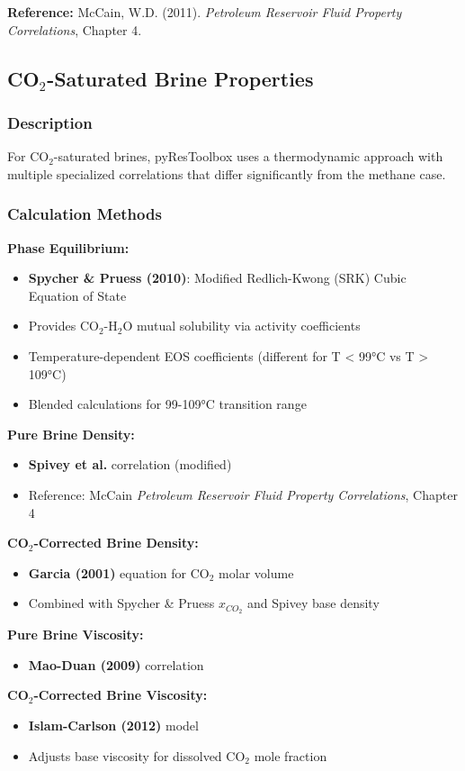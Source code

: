 \documentclass[11pt,a4paper]{article}
\begin{document}
\textbf{Reference:} McCain, W.D. (2011). \textit{Petroleum Reservoir Fluid Property Correlations}, Chapter 4.

\subsection{CO$_2$-Saturated Brine Properties}

\subsubsection{Description}
For CO$_2$-saturated brines, pyResToolbox uses a thermodynamic approach with multiple specialized correlations that differ significantly from the methane case.

\subsubsection{Calculation Methods}

\begin{tcolorbox}[colback=formulabox,colframe=black!75]
\textbf{Phase Equilibrium:}
\begin{itemize}
\item \textbf{Spycher \& Pruess (2010)}: Modified Redlich-Kwong (SRK) Cubic Equation of State
\item Provides CO$_2$-H$_2$O mutual solubility via activity coefficients
\item Temperature-dependent EOS coefficients (different for T < 99°C vs T > 109°C)
\item Blended calculations for 99-109°C transition range
\end{itemize}

\textbf{Pure Brine Density:}
\begin{itemize}
\item \textbf{Spivey et al.} correlation (modified)
\item Reference: McCain \textit{Petroleum Reservoir Fluid Property Correlations}, Chapter 4
\end{itemize}

\textbf{CO$_2$-Corrected Brine Density:}
\begin{itemize}
\item \textbf{Garcia (2001)} equation for CO$_2$ molar volume
\item Combined with Spycher \& Pruess $x_{CO_2}$ and Spivey base density
\end{itemize}

\textbf{Pure Brine Viscosity:}
\begin{itemize}
\item \textbf{Mao-Duan (2009)} correlation
\end{itemize}

\textbf{CO$_2$-Corrected Brine Viscosity:}
\begin{itemize}
\item \textbf{Islam-Carlson (2012)} model
\item Adjusts base viscosity for dissolved CO$_2$ mole fraction
\end{itemize}
\end{tcolorbox}
\end{document}
